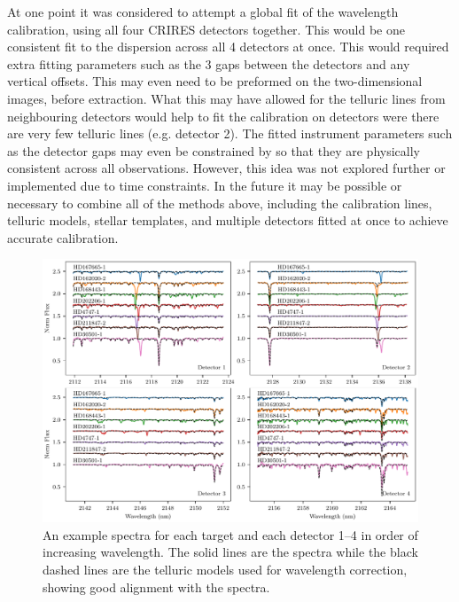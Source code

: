 


At one point it was considered to attempt a global fit of the wavelength calibration, using all four CRIRES detectors together. This would be one consistent fit to the dispersion across all 4 detectors at once. This would required extra fitting parameters such as the 3 gaps between the detectors and any vertical offsets. This may even need to be preformed on the two-dimensional images, before extraction. What this may have allowed  for the telluric lines from neighbouring detectors would help to fit the calibration on detectors were there are very few telluric lines (e.g. detector 2). The fitted instrument parameters such as the detector gaps may even be constrained by so that they are physically consistent across all observations. However, this idea was not explored further or implemented due to time constraints.
In the future it may be possible or necessary to combine all of the methods above, including the \thar{} calibration lines, telluric models, stellar templates, and multiple detectors fitted at once to achieve accurate calibration.


\begin{figure}
    \centering
    \includegraphics[width=1\linewidth]{figures/reduction/Spectra_examples}
    \caption{An example spectra for each target and each detector 1--4 in order of increasing wavelength. The solid lines are the spectra while the black dashed lines are the telluric models used for wavelength correction, showing good alignment with the spectra.}
    \label{fig:spectraexamples}
\end{figure}


